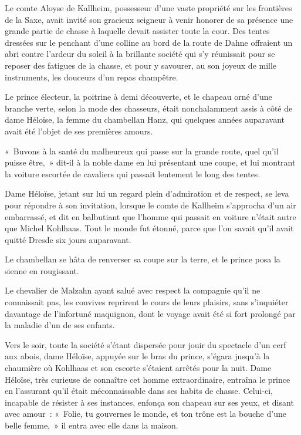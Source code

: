 \documentclass[french,twoside]{book} %
\newcommand\chaptercont{} %
\begin{document}
\chaptercont
\noindent Le comte Aloyse de Kallheim, possesseur d’une vaste propriété sur les frontières de la Saxe, avait invité son gracieux seigneur à venir honorer de sa présence une grande partie de chasse à laquelle devait assister toute la cour. Des tentes dressées sur le penchant d’une colline au bord de la route de Dahne offraient un abri contre l’ardeur du soleil à la brillante société qui s’y réunissait pour se reposer des fatigues de la chasse, et pour y savourer, au son joyeux de mille instruments, les douceurs d’un repas champêtre.\par
Le prince électeur, la poitrine à demi découverte, et le chapeau orné d’une branche verte, selon la mode des chasseurs, était nonchalamment assis à côté de dame Héloïse, la femme du chambellan Hanz, qui quelques années auparavant avait été l’objet de ses premières amours.\par
« Buvons à la santé du malheureux qui passe sur la grande route, quel qu’il puisse être, » dit-il à la noble dame en lui présentant une coupe, et lui montrant la voiture escortée de cavaliers qui passait lentement le long des tentes.\par
Dame Héloïse, jetant sur lui un regard plein d’admiration et de respect, se leva pour répondre à son invitation, lorsque le comte de Kallheim s’approcha d’un air embarrassé, et dit en balbutiant que l’homme qui passait en voiture n’était autre que Michel Kohlhaas. Tout le monde fut étonné, parce que l’on savait qu’il avait quitté Dresde six jours auparavant.\par
Le chambellan se hâta de renverser sa coupe sur la terre, et le prince posa la sienne en rougissant.\par
Le chevalier de Malzahn ayant salué avec respect la compagnie qu’il ne connaissait pas, les convives reprirent le cours de leurs plaisirs, sans s’inquiéter davantage de l’infortuné maquignon, dont le voyage avait été si fort prolongé par la maladie d’un de ses enfants.\par
Vers le soir, toute la société s’étant dispersée pour jouir du spectacle d’un cerf aux abois, dame Héloïse, appuyée sur le bras du prince, s’égara jusqu’à la chaumière où Kohlhaas et son escorte s’étaient arrêtés pour la nuit. Dame Héloïse, très curieuse de connaître cet homme extraordinaire, entraîna le prince en l’assurant qu’il était méconnaissable dans ses habits de chasse. Celui-ci, incapable de résister à ses instances, enfonça son chapeau sur ses yeux, et disant avec amour : « Folie, tu gouvernes le monde, et ton trône est la bouche d’une belle femme, » il entra avec elle dans la maison.\par
\end{document}
